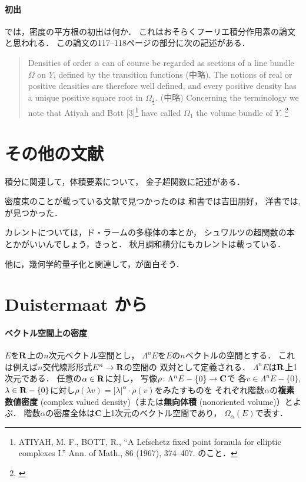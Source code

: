 \paragraph{初出\cite{Hor71}}
では，密度の平方根の初出は何か．
これはおそらくフーリエ積分作用素の論文\cite{Hor71}と思われる．
この論文の117--118ページの部分に次の記述がある．
\begin{quotation}
    Densities of order \(\alpha\) can of course be regarded 
    as sections of a line bundle \(\varOmega\) on \(Y\), 
    defined by the transition functions (中略). 
    The notions of real or positive densities are 
    therefore well defined, 
    and every positive density has 
    a unique positive square root in \(\varOmega_{\frac{1}{2}}\). 
    (中略)
    Concerning the terminology 
    we note that Atiyah and Bott [3]\footnote{
        ATIYAH, M. F., BOTT, R., 
        ``A Lefschetz fixed point formula 
        for elliptic complexes I.'' Ann. of Math., 86 (1967), 374--407. のこと．
    } have called \(\varOmega_1\) 
    the volume bundle of \(Y\).
    \footnote{\cite[p.117-118]{Hor71}}
\end{quotation}



\section*{その他の文献}
積分に関連して，体積要素について，
金子超関数\cite[参考4.2 (p.161), 参考4.3 (p.165)]{K96}に記述がある．


密度束のことが載っている文献で見つかったのは
和書では吉田朋好\cite[2.3.3項 (p.46--48)]{Y98}，
洋書では\cite[p.29]{BGV92}, \cite[p.427--434]{L13}が見つかった．

カレントについては，ド・ラームの多様体の本とか，
シュワルツの超関数の本とかがいいんでしょう，きっと．
秋月調和積分にもカレントは載っている．

他に，幾何学的量子化と関連して，\cite{BW97}が面白そう．

\section{Duistermaat から}

\paragraph{ベクトル空間上の密度}
\(E\)を\(\mathbf{R}\)上の\(n\)次元ベクトル空間とし，
\(\Lambda^n E\)を\(E\)の\(n\)ベクトルの空間とする．
これは例えば\(n\)交代線形形式\(E^n\to \mathbf{R}\)の空間の
双対として定義される．
\(\Lambda^n{E}\)は\(\mathbf{R}\)上1次元である．
任意の\(\alpha\in\mathbf{R}\)に対し，
写像\(\rho\colon\Lambda^n{E}-\{0\}\to\mathbf{C}\)で
各\(v\in\Lambda^n{E}-\{0\}\), \(\lambda\in\mathbf{R}-\{0\}\)に対し\(
    \rho(\lambda v)
    =\lvert{\lambda}\rvert^{\alpha}\cdot\rho(v)
\)をみたすものを
それぞれ階数\(\alpha\)の\textbf{複素数値密度} (complex valued 
density)（または\textbf{無向体積} (nonoriented volume)）とよぶ．
階数\(\alpha\)の密度全体は\(\mathbf{C}\)上1次元のベクトル空間であり，
\(\Omega_\alpha(E)\)で表す．

